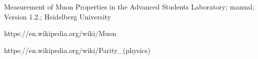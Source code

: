 \begin{thebibliography}{9}
Measurement of Muon Properties in the Advanced Students Laboratory; manual; Version 1.2.; Heidelberg University
\label{manual}

https://en.wikipedia.org/wiki/Muon
\label{muon}

https://en.wikipedia.org/wiki/Parity\_(physics)
\label{parity}




\end{thebibliography}